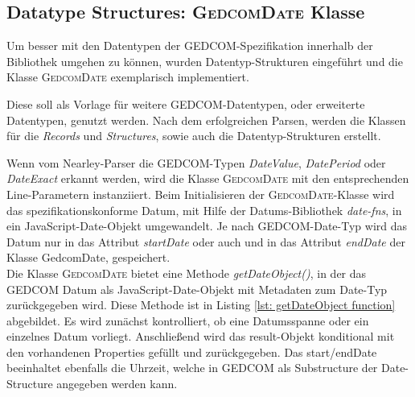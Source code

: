 \subsection{Datatype Structures: \textsc{GedcomDate} Klasse}
Um besser mit den Datentypen der GEDCOM-Spezifikation innerhalb der Bibliothek umgehen zu können, 
wurden Datentyp-Strukturen eingeführt und die Klasse \textsc{GedcomDate} exemplarisch implementiert.

Diese soll als Vorlage für weitere GEDCOM-Datentypen, oder erweiterte Datentypen, genutzt werden.
Nach dem erfolgreichen Parsen, werden die Klassen für die \textit{Records} und \textit{Structures}, 
sowie auch die Datentyp-Strukturen erstellt.

Wenn vom Nearley-Parser die GEDCOM-Typen \textit{DateValue}, \textit{DatePeriod} oder \textit{DateExact}
erkannt werden, wird die Klasse \textsc{GedcomDate} mit den entsprechenden Line-Parametern instanziiert.
Beim Initialisieren der \textsc{GedcomDate}-Klasse wird das spezifikationskonforme Datum, mit Hilfe der 
Datums-Bibliothek \textit{date-fns}, in ein JavaScript-Date-Objekt umgewandelt.
Je nach GEDCOM-Date-Typ wird das Datum nur in das Attribut \textit{startDate} oder auch und in das Attribut
\textit{endDate} der Klasse GedcomDate, gespeichert. \\
Die Klasse \textsc{GedcomDate} bietet eine Methode \textit{getDateObject()}, in der das GEDCOM Datum 
als JavaScript-Date-Objekt mit Metadaten zum Date-Typ zurückgegeben wird.
Diese Methode ist in Listing \ref{lst: getDateObject function} abgebildet. Es wird zunächst kontrolliert,
ob eine Datumsspanne oder ein einzelnes Datum vorliegt. Anschließend wird das result-Objekt konditional
mit den vorhandenen Properties gefüllt und zurückgegeben. Das start/endDate beeinhaltet ebenfalls die Uhrzeit, 
welche in GEDCOM als Substructure der Date-Structure angegeben werden kann.

\newpage

